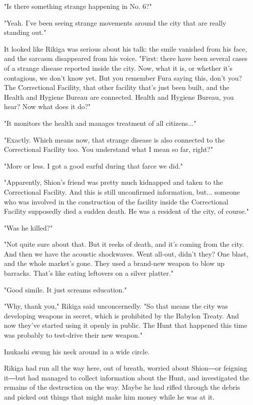 "Is there something strange happening in No. 6?"

"Yeah. I've been seeing strange movements around the city that are
really standing out."

It looked like Rikiga was serious about his talk: the smile vanished
from his face, and the sarcasm disappeared from his voice. "First: there
have been several cases of a strange disease reported inside the city.
Now, what it is, or whether it's contagious, we don't know yet. But you
remember Fura saying this, don't you? The Correctional Facility, that
other facility that's just been built, and the Health and Hygiene Bureau
are connected. Health and Hygiene Bureau, you hear? Now what does it
do?"

"It monitors the health and manages treatment of all citizens..."

"Exactly. Which means now, that strange disease is also connected to the
Correctional Facility too. You understand what I mean so far, right?"

"More or less. I got a good earful during that farce we did."

"Apparently, Shion's friend was pretty much kidnapped and taken to the
Correctional Facility. And this is still unconfirmed information, but...
someone who was involved in the construction of the facility inside the
Correctional Facility supposedly died a sudden death. He was a resident
of the city, of course."

"Was he killed?"

"Not quite sure about that. But it reeks of death, and it's coming from
the city. And then we have the acoustic shockwaves. Went all-out, didn't
they? One blast, and the whole market's gone. They used a brand-new
weapon to blow up barracks. That's like eating leftovers on a silver
platter."

"Good simile. It just screams education."

"Why, thank you," Rikiga said unconcernedly. "So that means the city was
developing weapons in secret, which is prohibited by the Babylon Treaty.
And now they've started using it openly in public. The Hunt that
happened this time was probably to test-drive their new weapon."

Inukashi swung his neck around in a wide circle.

Rikiga had run all the way here, out of breath, worried about Shion―or
feigning it―but had managed to collect information about the Hunt, and
investigated the remains of the destruction on the way. Maybe he had
rifled through the debris and picked out things that might make him
money while he was at it.

